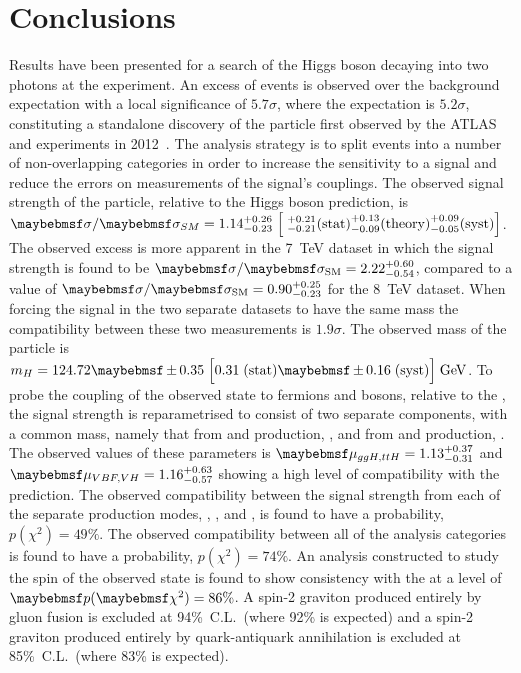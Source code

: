 \chapter{Conclusions}
\label{chap:conclusions}

Results have been presented for a search of the \SM Higgs boson decaying into two photons at the \CMS experiment. An excess of events is observed over the background expectation with a local significance of $5.7\sigma$, where the \SM expectation is $5.2\sigma$, constituting a standalone discovery of the particle first observed by the ATLAS and \CMS experiments in 2012~\cite{ATLASDiscovery,CMSDiscovery}. The analysis strategy is to split events into a number of non-overlapping categories in order to increase the sensitivity to a signal and reduce the errors on measurements of the signal's couplings. The observed signal strength of the particle, relative to the \SM Higgs boson prediction, is $\sigma/\sigma_{SM} = 1.14^{+0.26}_{-0.23} \;\Bigl[\;^{+0.21}_{-0.21} \mathrm{(stat)} ^{+0.13}_{-0.09} \mathrm{(theory)} ^{+0.09}_{-0.05} \mathrm{(syst)} \Bigr]$. The observed excess is more apparent in the 7~TeV dataset in which the signal strength is found to be $\musm=2.22^{+0.60}_{-0.54}$, compared to a value of $\musm=0.90^{+0.25}_{-0.23}$ for the 8~TeV dataset. When forcing the signal in the two separate datasets to have the same mass the compatibility between these two measurements is $1.9\sigma$. The observed mass of the particle is $m_{H} = 124.72 \pm 0.35 \; \Bigl[ 0.31 \mathrm{\;(stat)} \pm 0.16 \mathrm{\;(syst)} \Bigr] \mathrm{\;GeV}$. To probe the coupling of the observed state to fermions and bosons, relative to the \SM, the signal strength is reparametrised to consist of two separate components, with a common mass, namely that from \ggH and \ttH production, \RF, and from \VBF and \VH production, \RV. The observed values of these parameters is $\RF=1.13^{+0.37}_{-0.31}$ and $\RV=1.16^{+0.63}_{-0.57}$ showing a high level of compatibility with the \SM prediction. The observed compatibility between the signal strength from each of the separate production modes, \ggH, \VBF, \VH and \ttH, is found to have a probability, $p(\chi^{2})=49\%$. The observed compatibility between all of the analysis categories is found to have a probability, $p(\chi^{2})=74\%$. An analysis constructed to study the spin of the observed state is found to show consistency with the \SM at a level of $\p(\chi^{2})=86\%$. A spin-2 graviton produced entirely by gluon fusion is excluded at 94\%~C.L.~(where 92\% is expected) and a spin-2 graviton produced entirely by quark-antiquark annihilation is excluded at 85\%~C.L.~(where 83\% is expected).

